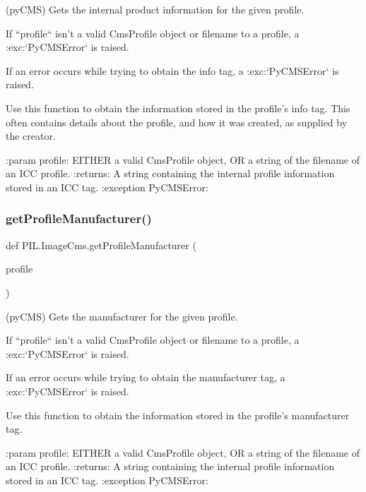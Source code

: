 \begin{DoxyVerb}(pyCMS) Gets the internal product information for the given profile.

If ``profile`` isn't a valid CmsProfile object or filename to a profile,
a :exc:`PyCMSError` is raised.

If an error occurs while trying to obtain the info tag,
a :exc:`PyCMSError` is raised.

Use this function to obtain the information stored in the profile's
info tag.  This often contains details about the profile, and how it
was created, as supplied by the creator.

:param profile: EITHER a valid CmsProfile object, OR a string of the
    filename of an ICC profile.
:returns: A string containing the internal profile information stored in
    an ICC tag.
:exception PyCMSError:
\end{DoxyVerb}
 \mbox{\label{namespacePIL_1_1ImageCms_a41c7060eb43edca637b22ebd34c721ba}} 
\subsubsection{\texorpdfstring{get\+Profile\+Manufacturer()}{getProfileManufacturer()}}
{\footnotesize\ttfamily def P\+I\+L.\+Image\+Cms.\+get\+Profile\+Manufacturer (\begin{DoxyParamCaption}\item[{}]{profile }\end{DoxyParamCaption})}

\begin{DoxyVerb}(pyCMS) Gets the manufacturer for the given profile.

If ``profile`` isn't a valid CmsProfile object or filename to a profile, a
:exc:`PyCMSError` is raised.

If an error occurs while trying to obtain the manufacturer tag, a
:exc:`PyCMSError` is raised.

Use this function to obtain the information stored in the profile's
manufacturer tag.

:param profile: EITHER a valid CmsProfile object, OR a string of the
    filename of an ICC profile.
:returns: A string containing the internal profile information stored in
    an ICC tag.
:exception PyCMSError:
\end{DoxyVerb}
 \mbox{\label{namespacePIL_1_1ImageCms_ac26b0034726ca94a6ab2814ef5969f5a}} 

